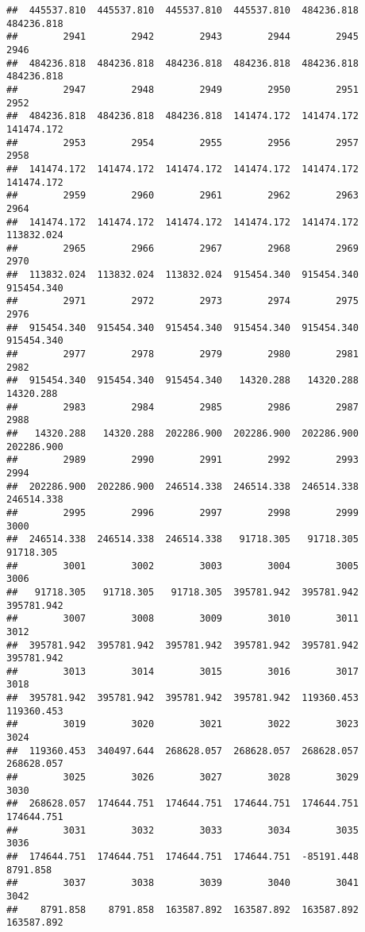 \documentclass[
]{book}
\begin{document}
\begin{verbatim}
##  445537.810  445537.810  445537.810  445537.810  484236.818  484236.818 
##        2941        2942        2943        2944        2945        2946 
##  484236.818  484236.818  484236.818  484236.818  484236.818  484236.818 
##        2947        2948        2949        2950        2951        2952 
##  484236.818  484236.818  484236.818  141474.172  141474.172  141474.172 
##        2953        2954        2955        2956        2957        2958 
##  141474.172  141474.172  141474.172  141474.172  141474.172  141474.172 
##        2959        2960        2961        2962        2963        2964 
##  141474.172  141474.172  141474.172  141474.172  141474.172  113832.024 
##        2965        2966        2967        2968        2969        2970 
##  113832.024  113832.024  113832.024  915454.340  915454.340  915454.340 
##        2971        2972        2973        2974        2975        2976 
##  915454.340  915454.340  915454.340  915454.340  915454.340  915454.340 
##        2977        2978        2979        2980        2981        2982 
##  915454.340  915454.340  915454.340   14320.288   14320.288   14320.288 
##        2983        2984        2985        2986        2987        2988 
##   14320.288   14320.288  202286.900  202286.900  202286.900  202286.900 
##        2989        2990        2991        2992        2993        2994 
##  202286.900  202286.900  246514.338  246514.338  246514.338  246514.338 
##        2995        2996        2997        2998        2999        3000 
##  246514.338  246514.338  246514.338   91718.305   91718.305   91718.305 
##        3001        3002        3003        3004        3005        3006 
##   91718.305   91718.305   91718.305  395781.942  395781.942  395781.942 
##        3007        3008        3009        3010        3011        3012 
##  395781.942  395781.942  395781.942  395781.942  395781.942  395781.942 
##        3013        3014        3015        3016        3017        3018 
##  395781.942  395781.942  395781.942  395781.942  119360.453  119360.453 
##        3019        3020        3021        3022        3023        3024 
##  119360.453  340497.644  268628.057  268628.057  268628.057  268628.057 
##        3025        3026        3027        3028        3029        3030 
##  268628.057  174644.751  174644.751  174644.751  174644.751  174644.751 
##        3031        3032        3033        3034        3035        3036 
##  174644.751  174644.751  174644.751  174644.751  -85191.448    8791.858 
##        3037        3038        3039        3040        3041        3042 
##    8791.858    8791.858  163587.892  163587.892  163587.892  163587.892 

\end{verbatim}
\end{document}
